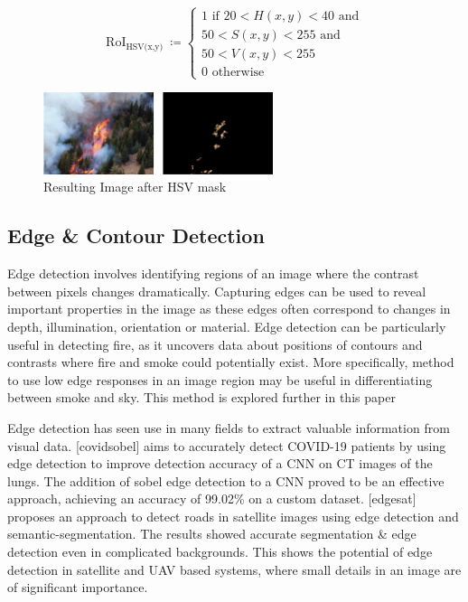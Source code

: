 \[\text{ RoI}_{\text{HSV(x,y) }} ≔ \begin{cases}
1\text{ if }20 < H(x,y) < 40\text{ and } \\
50 < S(x,y) < 255\text{ and } \\
50 < V(x,y) < 255 \\
0\text{ otherwise}
\end{cases}\]

\begin{figure}
\centering
\includegraphics[width=0.6\textwidth,height=\textheight]{hsv_filter.jpg}
\caption{Resulting Image after HSV mask}
\end{figure}

\label{sn}{}

\subsection{Edge \& Contour Detection}

Edge detection involves identifying regions of an image where the
contrast between pixels changes dramatically. Capturing edges can be
used to reveal important properties in the image as these edges often
correspond to changes in depth, illumination, orientation or material.
Edge detection can be particularly useful in detecting fire, as it
uncovers data about positions of contours and contrasts where fire and
smoke could potentially exist. More specifically, method to use low edge
responses in an image region may be useful in differentiating between
smoke and sky. This method is explored further in this paper

Edge detection has seen use in many fields to extract valuable
information from visual data. {[}covidsobel{]} aims to accurately detect
COVID-19 patients by using edge detection to improve detection accuracy
of a CNN on CT images of the lungs. The addition of sobel edge detection
to a CNN proved to be an effective approach, achieving an accuracy of
99.02\% on a custom dataset. {[}edgesat{]} proposes an approach to
detect roads in satellite images using edge detection and
semantic-segmentation. The results showed accurate segmentation \& edge
detection even in complicated backgrounds. This shows the potential of
edge detection in satellite and UAV based systems, where small details
in an image are of significant importance.

